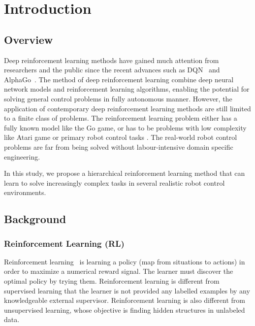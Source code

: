 \chapter{Introduction}
\section{Overview}
Deep reinforcement learning methods have gained much attention from researchers and the public since the recent advances such as DQN~\cite{mnih2015human} and AlphaGo~\cite{silver2016mastering}. The method of deep reinforcement learning combine deep neural network models and reinforcement learning algorithms, enabling the potential for solving general control problems in fully autonomous manner. 
However, the application of contemporary deep reinforcement learning methods are still limited to a finite class of problems. The reinforcement learning problem either has a fully known model like the Go game, or has to be problems with low complexity like Atari game \cite{mnih2015human} or primary robot control tasks \cite{duan2016benchmarking}. The real-world robot control problems are far from being solved without labour-intensive domain specific engineering.

In this study, we propose a hierarchical reinforcement learning method that can learn to solve increasingly complex tasks in several realistic robot control environments.

\section{Background}
\subsection{Reinforcement Learning (RL)}
Reinforcement learning~\cite{sutton1998reinforcement} is learning a policy (map from situations to actions) in order to maximize a numerical reward signal. The learner must discover the optimal policy by trying them. Reinforcement learning is different from supervised learning that the learner is not provided any labelled examples by any knowledgeable external supervisor. Reinforcement learning is also different from unsupervised learning, whose objective is finding hidden structures in unlabeled data.

